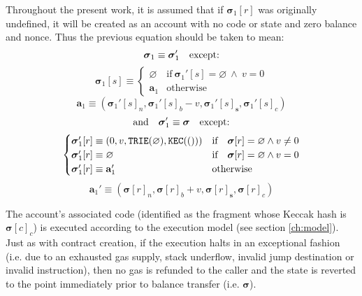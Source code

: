 \documentclass[9pt,oneside]{amsart}
\begin{document}
\begin{multicols}{2}
Throughout the present work, it is assumed that if $\boldsymbol{\sigma}_1[r]$ was originally undefined, it will be created as an account with no code or state and zero balance and nonce. Thus the previous equation should be taken to mean:
\begin{equation}
\boldsymbol{\sigma}_1 \equiv \boldsymbol{\sigma}_1' \quad \text{except:} \\
\end{equation}
\begin{equation}
\boldsymbol{\sigma}_1[s] \equiv \begin{cases}
\varnothing & \text{if}\ \boldsymbol{\sigma}_1'[s] = \varnothing \ \wedge\ v = 0 \\
\mathbf{a}_1 &\text{otherwise}
\end{cases}
\end{equation}
\begin{equation}
\mathbf{a}_1 \equiv (\boldsymbol{\sigma}_1'[s]_n, \boldsymbol{\sigma}_1'[s]_b - v, \boldsymbol{\sigma}_1'[s]_\mathbf{s}, \boldsymbol{\sigma}_1'[s]_c)
\end{equation}
\begin{equation}
\text{and}\quad \boldsymbol{\sigma}_1' \equiv \boldsymbol{\sigma} \quad \text{except:} \\
\end{equation}
\begin{equation}
\begin{cases}
\boldsymbol{\sigma}_1'[r] \equiv (0, v, \mathtt{\tiny TRIE}(\varnothing), \mathtt{\tiny KEC}(())) & \text{if} \quad \boldsymbol{\sigma}[r] = \varnothing \wedge v \neq 0 \\
\boldsymbol{\sigma}_1'[r] \equiv \varnothing & \text{if}\quad \boldsymbol{\sigma}[r] = \varnothing \wedge v = 0 \\
\boldsymbol{\sigma}_1'[r] \equiv \mathbf{a}_1' & \text{otherwise}
\end{cases}
\end{equation}
\begin{equation}
\mathbf{a}_1' \equiv (\boldsymbol{\sigma}[r]_n, \boldsymbol{\sigma}[r]_b + v, \boldsymbol{\sigma}[r]_\mathbf{s}, \boldsymbol{\sigma}[r]_c)
\end{equation}

The account's associated code (identified as the fragment whose Keccak hash is $\boldsymbol{\sigma}[c]_c$) is executed according to the execution model (see section \ref{ch:model}). Just as with contract creation, if the execution halts in an exceptional fashion (i.e. due to an exhausted gas supply, stack underflow, invalid jump destination or invalid instruction), then no gas is refunded to the caller and the state is reverted to the point immediately prior to balance transfer (i.e. $\boldsymbol{\sigma}$).


\end{multicols}
\end{document}
